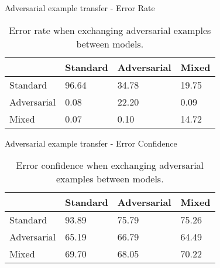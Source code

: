 \begin{tframe}{Adversarial example transfer - Error Rate}

\begin{table}[]
\centering
\label{my-label}
\begin{tabular}{@{}llll@{}}
\toprule
            & Standard & Adversarial & Mixed \\ \midrule
Standard    & 96.64    & 34.78       & 19.75 \\ 
Adversarial & 0.08     & 22.20       & 0.09  \\ 
Mixed       & 0.07     & 0.10        & 14.72 \\ \bottomrule
\end{tabular}
\caption{Error rate when exchanging adversarial examples between models.}
\end{table}

\end{tframe}


\begin{tframe}{Adversarial example transfer - Error Confidence}

\begin{table}[]
\centering
\label{my-label}
\begin{tabular}{@{}llll@{}}
\toprule
            & Standard & Adversarial & Mixed \\ \midrule
Standard    & 93.89    & 75.79       & 75.26 \\ 
Adversarial & 65.19    & 66.79       & 64.49 \\ 
Mixed       & 69.70    & 68.05       & 70.22 \\ \bottomrule
\end{tabular}
\caption{Error confidence when exchanging adversarial examples between models.}
\end{table}

\end{tframe}